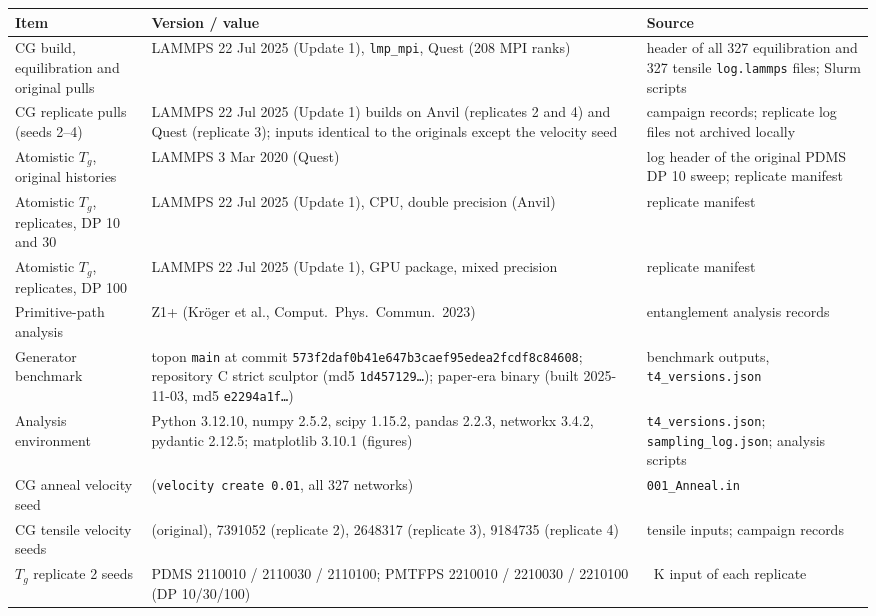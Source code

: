 \begin{tabular}{>{\raggedright\arraybackslash}p{3.9cm}>{\raggedright\arraybackslash}p{6.7cm}>{\raggedright\arraybackslash}p{4.5cm}}
\toprule
Item & Version / value & Source \\
\midrule
CG build, equilibration and original pulls & LAMMPS 22 Jul 2025 (Update 1), \texttt{lmp\_mpi}, Quest (208 MPI ranks) & header of all 327 equilibration and 327 tensile \texttt{log.lammps} files; Slurm scripts \\
CG replicate pulls (seeds 2--4) & LAMMPS 22 Jul 2025 (Update 1) builds on Anvil (replicates 2 and 4) and Quest (replicate 3); inputs identical to the originals except the velocity seed & campaign records; replicate log files not archived locally \\
Atomistic $T_g$, original histories & LAMMPS 3 Mar 2020 (Quest) & log header of the original PDMS DP 10 sweep; replicate manifest \\
Atomistic $T_g$, replicates, DP 10 and 30 & LAMMPS 22 Jul 2025 (Update 1), CPU, double precision (Anvil) & replicate manifest \\
Atomistic $T_g$, replicates, DP 100 & LAMMPS 22 Jul 2025 (Update 1), GPU package, mixed precision & replicate manifest \\
Primitive-path analysis & Z1+ (Kr\"oger et al., Comput.\ Phys.\ Commun.\ 2023) & entanglement analysis records \\
Generator benchmark & topon \texttt{main} at commit \texttt{573f2daf0b41e647b3ca}\allowbreak\texttt{ef95edea2fcdf8c84608}; repository C strict sculptor (md5 \texttt{1d457129\ldots}); paper-era binary (built 2025-11-03, md5 \texttt{e2294a1f\ldots}) & benchmark outputs, \texttt{t4\_versions.json} \\
Analysis environment & Python 3.12.10, numpy 2.5.2, scipy 1.15.2, pandas 2.2.3, networkx 3.4.2, pydantic 2.12.5; matplotlib 3.10.1 (figures) & \texttt{t4\_versions.json}; \texttt{sampling\_log.json}; analysis scripts \\
\midrule
CG anneal velocity seed & 4928459 (\texttt{velocity create 0.01}, all 327 networks) & \texttt{001\_Anneal.in} \\
CG tensile velocity seeds & 4928459 (original), 7391052 (replicate 2), 2648317 (replicate 3), 9184735 (replicate 4) & tensile inputs; campaign records \\
$T_g$ replicate 2 seeds & PDMS 2110010 / 2110030 / 2110100; PMTFPS 2210010 / 2210030 / 2210100 (DP 10/30/100) & 305~K input of each replicate \\

\end{tabular}
